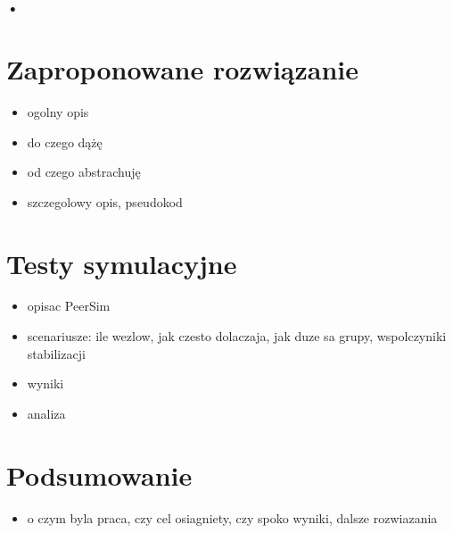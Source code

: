 \documentclass[12pt, twoside, openany]{report}
\begin{document}
\subsection{•}


\chapter{Zaproponowane rozwiązanie}
\label{rozdzial_rozwiazanie}
\begin{itemize}
\item ogolny opis
\item do czego dążę
\item od czego abstrachuję
\item szczegolowy opis, pseudokod
\end{itemize}


\chapter{Testy symulacyjne}

\begin{itemize}
\item opisac PeerSim
\item scenariusze: ile wezlow, jak czesto dolaczaja, jak duze sa grupy, wspolczyniki stabilizacji
\item wyniki
\item analiza
\end{itemize}


\chapter{Podsumowanie}

\begin{itemize}
\item o czym byla praca, czy cel osiagniety, czy spoko wyniki, dalsze rozwiazania
\end{itemize}


\end{document}
